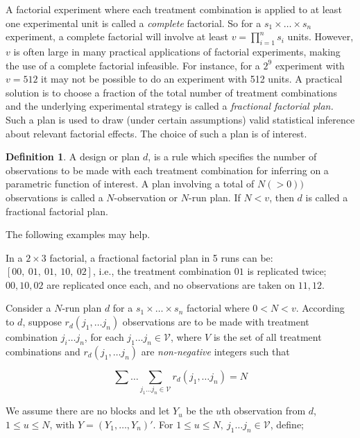 \documentclass[12pt]{article}
\theoremstyle{definition}
\newtheorem{defn}{Definition}
\newenvironment{definition}{
\begin{tcolorbox}[colback=green!5!white,colframe=green!75!black, parbox = false]\begin{defn} }{\end{defn}\end{tcolorbox} }
\newenvironment{example}[1][\unskip]{
\begin{tcolorbox}[colback=blue!5!white,colframe=blue!75!black, title = {Example #1}, parbox = false] }{\end{tcolorbox} }
\begin{document}
A factorial experiment where each treatment combination is applied to at least one experimental unit is called a \textit{complete} factorial. So for a $s_1\times \ldots\times s_n$ experiment, a complete factorial will involve at least $v=\prod_{i=1}^ns_i$ units.  However, $v$ is often large  in many practical applications of factorial experiments, making the use of a complete factorial infeasible. For instance,  for a $2^9$ experiment with $v= 512$  it may not be possible to do an experiment with 512 units.  A practical solution is to choose a fraction of the total number of treatment combinations and the underlying experimental strategy is called a \textit{fractional factorial plan.} Such a plan is used to draw (under certain assumptions) valid statistical inference about relevant factorial effects. The choice of such a plan is of interest. 
	
\begin{definition}
    A design or plan $d$, is a rule which specifies the number of observations to be made with each treatment combination for inferring on a parametric function of interest.  A plan involving a total of $N(>0))$ observations is called a $N$-observation or $N$-run plan. If $N<v$, then $d$ is called a fractional factorial plan. 
\end{definition}	

The following examples may help.

\begin{example}
    In a $2\times 3$ factorial, a fractional factorial plan in 5 runs can be:
	 $[ 00, \ 01, \ 01, \ 10, \ 02 ]$, i.e., the treatment combination $01$ is replicated twice; $00, 10, 02$ are replicated once each, and no observations are taken on $11, 12$.
\end{example}

Consider a $N$-run plan $d$ for a $s_1\times\ldots\times s_n$ factorial where $0<N<v$. According to $d$, suppose $r_d(j_1, \ldots j_n)$ observations are to be made with treatment combination $j_i\ldots j_n$, for each $j_1\ldots j_n \in \mathcal{V}$, where $V$ is the set of all treatment combinations and $r_d(j_1, \ldots j_n)$ are \textit{non-negative} integers such that
	
$$\sum \ldots \sum_{j_1\ldots j_n \in \mathcal{V}} r_d(j_1, \ldots j_n) = N$$
	
We assume there are no blocks and let $Y_u$ be the $u$th observation from $d$, $1\leq u\leq N$, with $Y = (Y_1, \ldots, Y_n)'$. For $1\leq u\leq N, \ j_1\ldots j_n\in \mathcal{V}$, define;
	
\end{document}
